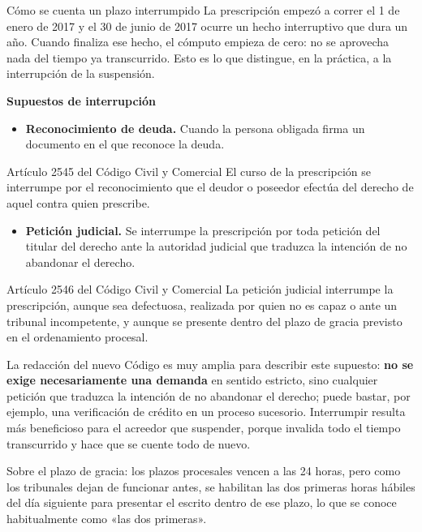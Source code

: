 \documentclass[12pt,oneside]{book}
\begin{document}
\begin{example}{Cómo se cuenta un plazo interrumpido}
La prescripción empezó a correr el 1 de enero de 2017 y el 30 de junio de 2017 ocurre un hecho interruptivo que dura un año. Cuando finaliza ese hecho, el cómputo empieza de cero: no se aprovecha nada del tiempo ya transcurrido. Esto es lo que distingue, en la práctica, a la interrupción de la suspensión.
\end{example}

\textbf{Supuestos de interrupción}

\begin{itemize}
    \item \textbf{Reconocimiento de deuda.} Cuando la persona obligada firma un documento en el que reconoce la deuda.
\end{itemize}

\begin{articulo}{Artículo 2545 del Código Civil y Comercial}
El curso de la prescripción se interrumpe por el reconocimiento que el deudor o poseedor efectúa del derecho de aquel contra quien prescribe.
\end{articulo}

\begin{itemize}
    \item \textbf{Petición judicial.} Se interrumpe la prescripción por toda petición del titular del derecho ante la autoridad judicial que traduzca la intención de no abandonar el derecho.
\end{itemize}

\begin{articulo}{Artículo 2546 del Código Civil y Comercial}
La petición judicial interrumpe la prescripción, aunque sea defectuosa, realizada por quien no es capaz o ante un tribunal incompetente, y aunque se presente dentro del plazo de gracia previsto en el ordenamiento procesal.
\end{articulo}

La redacción del nuevo Código es muy amplia para describir este supuesto: \textbf{no se exige necesariamente una demanda} en sentido estricto, sino cualquier petición que traduzca la intención de no abandonar el derecho; puede bastar, por ejemplo, una verificación de crédito en un proceso sucesorio. Interrumpir resulta más beneficioso para el acreedor que suspender, porque invalida todo el tiempo transcurrido y hace que se cuente todo de nuevo.

Sobre el plazo de gracia: los plazos procesales vencen a las 24 horas, pero como los tribunales dejan de funcionar antes, se habilitan las dos primeras horas hábiles del día siguiente para presentar el escrito dentro de ese plazo, lo que se conoce habitualmente como «las dos primeras».
\end{document}
